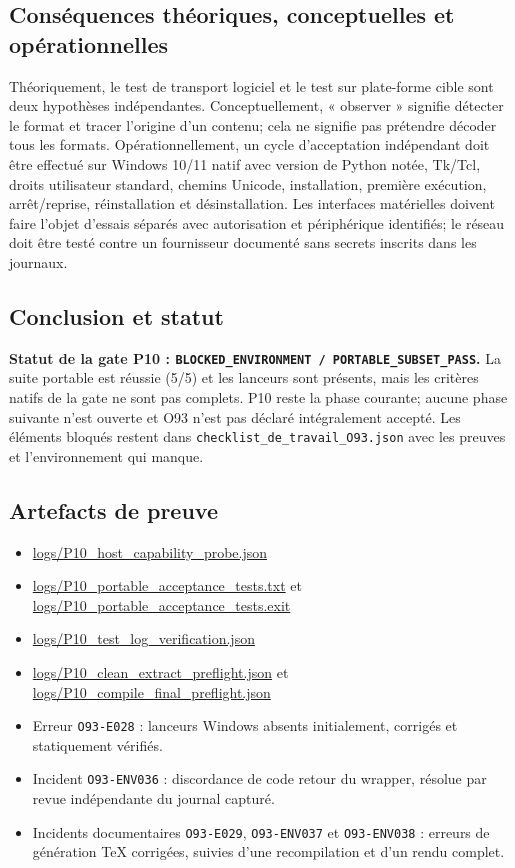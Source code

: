 \documentclass[11pt,a4paper,oneside]{report}
\begin{document}
\subsection*{Conséquences théoriques, conceptuelles et opérationnelles}
Théoriquement, le test de transport logiciel et le test sur plate-forme cible sont deux hypothèses indépendantes. Conceptuellement, « observer » signifie détecter le format et tracer l'origine d'un contenu; cela ne signifie pas prétendre décoder tous les formats. Opérationnellement, un cycle d'acceptation indépendant doit être effectué sur Windows 10/11 natif avec version de Python notée, Tk/Tcl, droits utilisateur standard, chemins Unicode, installation, première exécution, arrêt/reprise, réinstallation et désinstallation. Les interfaces matérielles doivent faire l'objet d'essais séparés avec autorisation et périphérique identifiés; le réseau doit être testé contre un fournisseur documenté sans secrets inscrits dans les journaux.

\subsection*{Conclusion et statut}
\textbf{Statut de la gate P10 : \texttt{BLOCKED\_ENVIRONMENT / PORTABLE\_SUBSET\_PASS}.} La suite portable est réussie (5/5) et les lanceurs sont présents, mais les critères natifs de la gate ne sont pas complets. P10 reste la phase courante; aucune phase suivante n'est ouverte et O93 n'est pas déclaré intégralement accepté. Les éléments bloqués restent dans \texttt{checklist\_de\_travail\_O93.json} avec les preuves et l'environnement qui manque.

\subsection*{Artefacts de preuve}
\begin{itemize}
\item \url{logs/P10_host_capability_probe.json}
\item \url{logs/P10_portable_acceptance_tests.txt} et \url{logs/P10_portable_acceptance_tests.exit}
\item \url{logs/P10_test_log_verification.json}
\item \url{logs/P10_clean_extract_preflight.json} et \url{logs/P10_compile_final_preflight.json}
\item Erreur \texttt{O93-E028} : lanceurs Windows absents initialement, corrigés et statiquement vérifiés.
\item Incident \texttt{O93-ENV036} : discordance de code retour du wrapper, résolue par revue indépendante du journal capturé.
\item Incidents documentaires \texttt{O93-E029}, \texttt{O93-ENV037} et \texttt{O93-ENV038} : erreurs de génération TeX corrigées, suivies d'une recompilation et d'un rendu complet.
\end{itemize}
\end{document}
